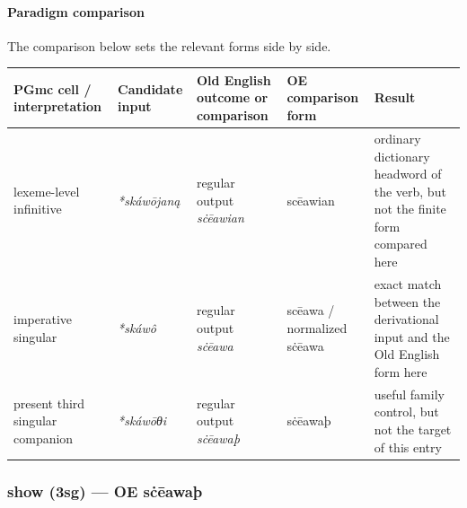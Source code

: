 \documentclass[
  british,
  a4paper,
]{article}
\newcounter{none} %
\begin{document}
\paragraph{Paradigm comparison}\label{paradigm-comparison-26}

The comparison below sets the relevant forms side by side.

{\def\LTcaptype{none} %
\begin{longtable}[]{@{}
  >{\raggedright\arraybackslash}p{}
  >{\raggedright\arraybackslash}p{}
  >{\raggedright\arraybackslash}p{}
  >{\raggedright\arraybackslash}p{}
  >{\raggedright\arraybackslash}p{}@{}}
\toprule\noalign{}
\begin{minipage}[b]{\linewidth}\raggedright
PGmc cell / interpretation
\end{minipage} & \begin{minipage}[b]{\linewidth}\raggedright
Candidate input
\end{minipage} & \begin{minipage}[b]{\linewidth}\raggedright
Old English outcome or comparison
\end{minipage} & \begin{minipage}[b]{\linewidth}\raggedright
OE comparison form
\end{minipage} & \begin{minipage}[b]{\linewidth}\raggedright
Result
\end{minipage} \\
\midrule\noalign{}
\endhead
\bottomrule\noalign{}
\endlastfoot
lexeme-level infinitive & \emph{*skáwōjaną} & regular output
\emph{sċēawian} & scēawian & ordinary dictionary headword of the verb,
but not the finite form compared here \\
imperative singular & \emph{*skáwô} & regular output \emph{sċēawa} &
scēawa / normalized sċēawa & exact match between the derivational input
and the Old English form here \\
present third singular companion & \emph{*skáwōθi} & regular output
\emph{sċēawaþ} & sċēawaþ & useful family control, but not the target of
this entry \\
\end{longtable}
}

\subsubsection{show (3sg) --- OE
sċēawaþ}\label{show-3sg-oe-sux10bux113awauxfe}
\end{document}
